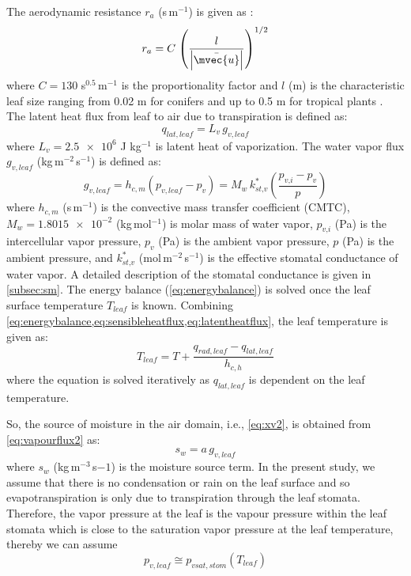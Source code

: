 The aerodynamic resistance $r_a$ (s\,m$^{-1}$) is given as \citep{Dauzat2001, Robitu2006}:
\begin{equation}
{r_a} = C\;{\left( {\frac{l}{{\left| {\bar{\mvec{u}}} \right|}}} \right)^{1/2}}
\label{eq:ra}
\end{equation}
where $C=130$ s$^{0.5}$\,m$^{-1}$ is the proportionality factor and $l$ (m) is the characteristic leaf size ranging from 0.02 m for conifers and up to 0.5 m for tropical plants \citep{Bruse1998}. The latent heat flux from leaf to air due to transpiration is defined as:
\begin{equation}
{q_{lat,leaf}} = {L_v} \, {g_{v,leaf}}
\label{eq:latentheatflux}
\end{equation}
where $L_v=\num{2.5e6}$ J kg$^{-1}$ is latent heat of vaporization. The water vapor flux $g_{v,leaf}$ (kg\,m$^{-2}$\,s$^{-1}$) is defined as:
\begin{equation}
{g_{\mathit{v,leaf}}} = {h_{c,m}}\left( {{p_{\mathit{v,leaf}}} - {p_v}} \right) = M_w\, k_{\textit{st,v}}^* \left( \frac{p_{\textit{v,i}} - {p_v}}{p} \right)
\label{eq:vapourflux2}
\end{equation}
where $h_{c,m}$ (s\,m$^{-1}$) is the convective mass transfer coefficient (CMTC), $M_w = \num{1.8015e-2}$ (kg\,mol$^{-1}$) is molar mass of water vapor, $p_{\textit{v,i}}$ (Pa) is the intercellular vapor pressure, $p_v$ (Pa) is the ambient vapor pressure, $p$ (Pa) is the ambient pressure, and $k_{\textit{st,v}}^*$ (mol\,m$^{-2}$\,s$^{-1}$) is the effective stomatal conductance of water vapor. A detailed description of the stomatal conductance is given in \cref{subsec:sm}. The energy balance (\cref{eq:energybalance}) is solved once the leaf surface temperature $T_{\mathit{leaf}}$ is known. Combining \cref{eq:energybalance,eq:sensibleheatflux,eq:latentheatflux}, the leaf temperature is given as:
\begin{equation}
{T_{\mathit{leaf}}} = T + \frac{{{q_{\mathit{rad,leaf}}} - {q_{\mathit{lat,leaf}}}}}{{{h_{c,h}}}}
\label{eq:solveleaft}
\end{equation}
where the equation is solved iteratively as $q_{\mathit{lat,leaf}}$ is dependent on the leaf temperature.

So, the source of moisture in the air domain, i.e., \cref{eq:xv2}, is obtained from \cref{eq:vapourflux2} as:
\begin{equation}
s_w = a\,{g_{\mathit{v,leaf}}}
\label{eq:sw}
\end{equation}
where $s_w$ (kg\,m$^{-3}$\,s${-1}$) is the moisture source term. In the present study, we assume that there is no condensation or rain on the leaf surface and so evapotranspiration is only due to transpiration through the leaf stomata. Therefore, the vapor pressure at the leaf is the vapour pressure within the leaf stomata which is close to the saturation vapor pressure at the leaf temperature, thereby we can assume
\begin{equation}
p_{\mathit{v,leaf}}\cong p_{\mathit{vsat,stom}} \left(T_{\mathit{leaf}}\right)
\end{equation}

